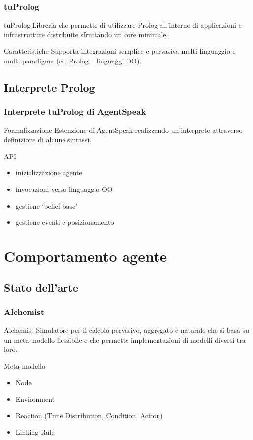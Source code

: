 \documentclass[handout]{beamer}\mode<presentation>{\usetheme{AMSCesenaBleu}}
\begin{document}
\begin{frame}
\frametitle{tuProlog}
\begin{block}{tuProlog}
Libreria che permette di utilizzare Prolog all'interno di applicazioni e infrastrutture distribuite sfruttando un core minimale.
\end{block}

\begin{block}{Caratteristiche}
Supporta integrazioni semplice e pervasiva multi-linguaggio e multi-paradigma (es. Prolog -- linguaggi OO).

\end{block}
\end{frame}


\subsection{Interprete Prolog}

\begin{frame}
\frametitle{Interprete tuProlog di AgentSpeak}
\begin{block}{Formalizzazione}
Estenzione di AgentSpeak realizzando un'interprete attraverso definizione di alcune sintassi.
\end{block}

\begin{block}{API}
\begin{itemize}
\item inizializzazione agente
\item invocazioni verso linguaggio OO
\item gestione `belief base'
\item gestione eventi e posizionamento
\end{itemize}
\end{block}
\end{frame}



\section{Comportamento agente}

\subsection{Stato dell'arte}

\begin{frame}
\frametitle{Alchemist}
\begin{block}{Alchemist}
Simulatore per il calcolo pervasivo, aggregato e naturale che si basa su un meta-modello flessibile e che permette implementazioni di modelli diversi tra loro.
\end{block}
\begin{block}{Meta-modello}
\begin{itemize}
\item Node
\item Environment
\item Reaction (Time Distribution, Condition, Action)
\item Linking Rule
\end{itemize}
\end{block}
\end{frame}
\end{document}
